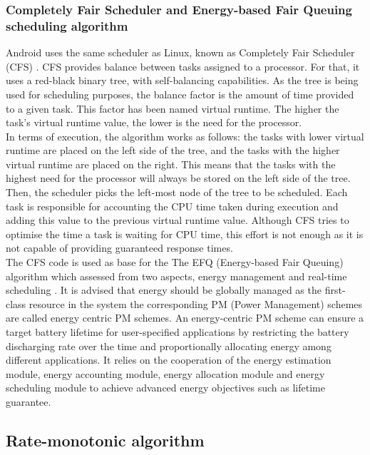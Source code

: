 \documentclass[conference]{IEEEtran}
\begin{document}
\subsubsection{Completely Fair Scheduler and Energy-based Fair Queuing scheduling algorithm}

Android uses the same scheduler as Linux, known as Completely Fair Scheduler (CFS) \cite{ANDR01}. CFS provides balance between tasks assigned to a processor. For that, it uses a red-black binary tree,  with self-balancing capabilities.  As the tree is being used for scheduling purposes, the balance factor is the amount of time provided to a given task. This factor has been named virtual runtime. The higher the task’s virtual runtime value, the lower is the need for the processor.\\
In terms of execution, the algorithm works as follows: the tasks with lower virtual runtime are placed on the left side of the tree, and the tasks with the higher virtual runtime are placed on the right. This means that the tasks with the highest need for the processor will always be  stored on the left side of the tree. Then, the scheduler picks the left-most node of the tree to be scheduled. Each task is responsible for accounting the CPU time taken during execution and adding this value to the previous virtual runtime value. Although CFS tries to optimise the time a task is waiting for CPU time, this effort is not enough as it is not capable of providing guaranteed response times. \\
The CFS code is used as base for the The EFQ (Energy-based Fair Queuing) algorithm which assessed from two aspects, energy management and real-time scheduling \cite{WEI01}. 
It is advised that energy should be globally managed as the first-class resource in the system  the corresponding PM (Power Management) schemes are called energy centric PM schemes. An energy-centric PM scheme can ensure a target battery lifetime for user-specified applications by restricting the battery discharging rate over the time and proportionally allocating energy among different applications.  It relies on the cooperation of the energy estimation module, energy accounting module, energy allocation module and energy scheduling module to achieve advanced energy objectives such as lifetime guarantee.

\subsection{Rate-monotonic algorithm}
\end{document}
